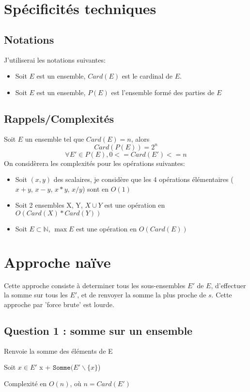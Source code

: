 \documentclass[10pt]{article}
\let\oldReturn\Return
\renewcommand{\Return}{\State\oldReturn}
\begin{document}
	\newpage
	\section{Spécificités techniques}\label{approche_naive}
		\subsection{Notations}
			J'utiliserai les notations suivantes:
			\begin{itemize}[label=-]
				\setlength\itemsep{0.1em}
				\item Soit $E$ est un ensemble, $Card(E)$ est le cardinal de $E$.
				\item Soit $E$ est un ensemble, $P(E)$ est l'ensemble formé des parties de $E$
			\end{itemize}
		\subsection{Rappels/Complexités}
			Soit $E$ un ensemble tel que $Card(E) = n$, alors
			$$Card(P(E)) = 2^n$$
			$$\forall E' \in P(E) , 0 <= Card(E') <= n$$
			\newline
			\newline
			On considèrera les complexités pour les opérations suivantes:
			\begin{itemize}[label=-]
				\setlength\itemsep{0.1em}
				\item Soit $(x, y)$ des scalaires, je considère que les 4 opérations élémentaires ($x+y$, $x-y$, $x*y$, $x/y$) sont en $O(1)$
				\item Soit 2 ensembles X, Y, $X \cup Y$ est une opération en $O(Card(X) * Card(Y))$
				\item Soit $E \subset \mathbb{N}$, $\max{E}$ est une opération en $O(Card(E))$
			\end{itemize}

	\newpage
	\section{Approche naïve}\label{approche_naive}
		Cette approche consiste à determiner tous les sous-ensembles $E'$ de $E$, d'effectuer la somme sur
		tous les $E'$, et de renvoyer la somme la plus proche de $s$. Cette approche par 'force brute' est lourde.
		\newline
		\newline
		\subsection{Question 1 : somme sur un ensemble}
			\begin{algorithm}
				\caption{Renvoie la somme des éléments de E}
				\begin{algorithmic}[1]
							\Return 0
						\EndIf
						\State Soit $x \in E'$
						\Return x + $\mathtt{Somme}(E' \backslash \{x\}$)
					\EndFunction
				\end{algorithmic}
			\end{algorithm}
			Complexité en $\boxed{O(n)}$, où $n = Card(E')$
			
\end{document}
